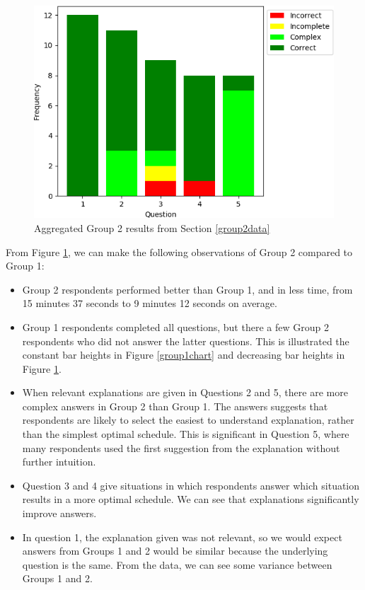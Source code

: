 \begin{figure}[H]
	\label{group2chart}
	\begin{center}
		\includegraphics[scale=0.55]{figures/questionnaire_results_group_two}
	\end{center}
	\caption{Aggregated Group 2 results from Section \ref{group2data}}
\end{figure}

From Figure \ref{group2chart}, we can make the following observations of Group 2 compared to Group 1:
\begin{itemize}
	\item Group 2 respondents performed better than Group 1, and in less time, from 15 minutes 37 seconds to 9 minutes 12 seconds on average.
	\item Group 1 respondents completed all questions, but there a few Group 2 respondents who did not answer the latter questions. This is illustrated the constant bar heights in Figure \ref{group1chart} and decreasing bar heights in Figure \ref{group2chart}.
	\item When relevant explanations are given in Questions 2 and 5, there are more complex answers in Group 2 than Group 1. The answers suggests that respondents are likely to select the easiest to understand explanation, rather than the simplest optimal schedule. This is significant in Question 5, where many respondents used the first suggestion from the explanation without further intuition.
	\item Question 3 and 4 give situations in which respondents answer which situation results in a more optimal schedule. We can see that explanations significantly improve answers.
	\item In question 1, the explanation given was not relevant, so we would expect answers from Groups 1 and 2 would be similar because the underlying question is the same. From the data, we can see some variance between Groups 1 and 2.
\end{itemize}

